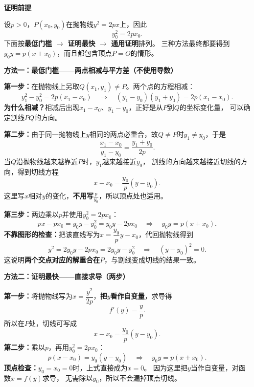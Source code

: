 \begin{proofbox}
\textbf{证明前提}

设$p>0$，$P(x_0,y_0)$在抛物线$y^2=2px$上，因此
\[
    y_0^2=2px_0.
\]
下面按\textbf{最低门槛 $\rightarrow$ 证明最快 $\rightarrow$ 通用证明}排列。
三种方法最终都要得到$\boxed{y_0y=p(x+x_0)}$，而且都包含顶点$P=O$的情形。

\medskip
\begin{minipage}{\linewidth}
\textbf{方法一：最低门槛——两点相减与平方差（不使用导数）}
\begin{center}\end{center}
\end{minipage}\par\medskip

\textbf{第一步：}在抛物线上另取$Q(x_1,y_1)\ne P$。两个点的方程相减：
\[
 y_1^2-y_0^2=2p(x_1-x_0)
 \quad\Longrightarrow\quad
 (y_1-y_0)(y_1+y_0)=2p(x_1-x_0).
\]
\textbf{为什么相减？}相减后出现$x_1-x_0$、$y_1-y_0$，正好是从$P$到$Q$的坐标变化量，
可以确定割线$PQ$的方向。

\textbf{第二步：}由于同一抛物线上$y$相同的两点必重合，故$Q\ne P$时$y_1\ne y_0$，于是
\[
    \frac{x_1-x_0}{y_1-y_0}=\frac{y_1+y_0}{2p}.
\]
当$Q$沿抛物线越来越靠近$P$时，$y_1$越来越接近$y_0$，
割线的方向越来越接近切线的方向，得到切线方程
\[
    x-x_0=\frac{y_0}{p}(y-y_0).
\]
这里写$x$相对$y$的变化，\textbf{不用写$\frac{p}{y_0}$}，所以顶点处也适用。

\textbf{第三步：}两边乘以$p$并使用$y_0^2=2px_0$：
\[
    px-px_0=y_0y-y_0^2=y_0y-2px_0
    \quad\Longrightarrow\quad
    \boxed{y_0y=p(x+x_0)}.
\]
\textbf{不靠图形的检查：}把该直线写为$x=\dfrac{y_0}{p}y-x_0$，代回抛物线得到
\[
    y^2=2y_0y-2px_0=2y_0y-y_0^2
    \quad\Longrightarrow\quad (y-y_0)^2=0.
\]
这说明\textbf{两个交点对应的解重合在$P$}，与割线变成切线的结果一致。

\medskip
\begin{minipage}{\linewidth}
\textbf{方法二：证明最快——直接求导（两步）}
\begin{center}\end{center}
\end{minipage}\par\medskip

\textbf{第一步：}将抛物线写为$x=\dfrac{y^2}{2p}$，\textbf{把$y$看作自变量}，求导得
\[
    f'(y)=\frac{y}{p}.
\]
所以在$P$处，切线可写成
\[
    x-x_0=\frac{y_0}{p}(y-y_0).
\]
\textbf{第二步：}乘以$p$，再用$y_0^2=2px_0$：
\[
    p(x-x_0)=y_0(y-y_0)
    \quad\Longrightarrow\quad
    \boxed{y_0y=p(x+x_0)}.
\]
\textbf{顶点检查：}$y_0=x_0=0$时，上式直接成为$x=0$。
因为这里把$y$当作自变量，对函数$x=f(y)$求导，
无需除以$y_0$，所以不会漏掉顶点切线。


\end{proofbox}

